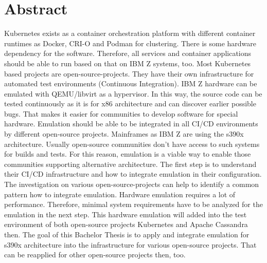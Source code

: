 \section*{Abstract}
\label{sec:abstract}
Kubernetes exists as a container orchestration platform with different container runtimes as Docker, CRI-O and Podman for clustering. There is some hardware dependency for the software. Therefore, all services and container applications should be able to run based on that on IBM Z systems, too. Most Kubernetes based projects are open-source-projects. They have their own infrastructure for automated test environments (Continuous Integration). IBM Z hardware can be emulated with QEMU/libvirt as a hypervisor. In this way, the source code can be tested continuously as it is for x86 architecture and can discover earlier possible bugs. That makes it easier for communities to develop software for special hardware. Emulation should be able to be integrated in all CI/CD environments by different open-source projects. Mainframes as IBM Z are using the s390x architecture. Usually open-source communities don't have access to such systems for builds and tests. For this reason, emulation is a viable way to enable those communities supporting alternative architecture.
The first step is to understand their CI/CD infrastructure and how to integrate emulation in their
configuration. The investigation on various open-source-projects can help to identify a common pattern how to integrate emulation. Hardware emulation requires a lot of performance. Therefore, minimal system requirements have to be analyzed for the emulation in the next step. This hardware emulation will added into the test environment of both open-source projects Kubernetes and Apache Cassandra then. The goal of this Bachelor Thesis is to apply and integrate emulation for s390x architecture into the infrastructure for various open-source projects. That can be reapplied for other open-source projects then, too. 

